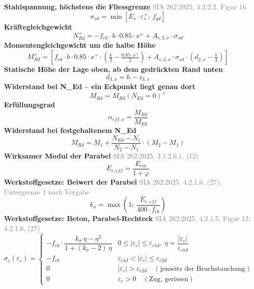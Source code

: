\documentclass[11pt,a4paper]{article}
\newcommand{\normref}[1]{{\small\textcolor{gray}{#1}}}
\begin{document}
\noindent\textbf{Stahlspannung, höchstens die Fliessgrenze} \hfill \normref{SIA 262:2025, 4.2.2.2, Figur 16}
\begin{equation*}
\sigma_{sd} = \min\left[E_s \cdot \varepsilon_s^{+};\ f_{yd}\right]
\end{equation*}
\noindent\textbf{Kräftegleichgewicht}
\begin{equation*}
N_{Rd}^{+} = -f_{cd} \cdot b \cdot 0.85 \cdot x^{+} + A_{s,2,x} \cdot \sigma_{sd}
\end{equation*}
\noindent\textbf{Momentengleichgewicht um die halbe Höhe}
\begin{equation*}
M_{Rd}^{+} = \left[f_{cd} \cdot b \cdot 0.85 \cdot x^{+} \cdot \left(\tfrac{h}{2} - \tfrac{0.85 \cdot x^{+}}{2}\right) + A_{s,2,x} \cdot \sigma_{sd} \cdot \left(d_{2,x} - \tfrac{h}{2}\right)\right]
\end{equation*}
\noindent\textbf{Statische Höhe der Lage oben, ab dem gedrückten Rand unten}
\begin{equation*}
d_{3,x} = h - z_{3,x}
\end{equation*}
\noindent\textbf{Widerstand bei N\_Ed – ein Eckpunkt liegt genau dort}
\begin{equation*}
M_{Rd} = M_{Rd}(N_{Ed}=0)^{+}
\end{equation*}
\noindent\textbf{Erfüllungsgrad}
\begin{equation*}
\alpha_{eff,x} = \frac{M_{Rd}}{M_{Ed}}
\end{equation*}
\noindent\textbf{Widerstand bei festgehaltenem N\_Ed}
\begin{equation*}
M_{Rd} = M_1 + \frac{N_{Ed} - N_1}{N_2 - N_1} \cdot \left(M_2 - M_1\right)
\end{equation*}
\noindent\textbf{Wirksamer Modul der Parabel} \hfill \normref{SIA 262:2025, 3.1.2.6.1, (12)}
\begin{equation*}
E_{c,eff} = \frac{E_{cm}}{1 + \varphi}
\end{equation*}
\noindent\textbf{Werkstoffgesetze: Beiwert der Parabel} \hfill \normref{SIA 262:2025, 4.2.1.6, (27); Untergrenze 1 nach Vorgabe}
\begin{equation*}
k_{\sigma} = \max\left(1;\ \frac{E_{c,eff}}{400 \cdot f_{ck}}\right)
\end{equation*}
\noindent\textbf{Werkstoffgesetze: Beton, Parabel-Rechteck} \hfill \normref{SIA 262:2025, 4.2.1.5, Figur 12; 4.2.1.6, (27)}
\begin{equation*}
\sigma_c(\varepsilon_c) = \begin{cases} -f_{ck} \cdot \dfrac{k_\sigma\,\eta - \eta^2}{1 + (k_\sigma - 2)\,\eta} & 0 \le |\varepsilon_c| \le \varepsilon_{c1d},\ \eta = \dfrac{|\varepsilon_c|}{\varepsilon_{c1d}} \\[2ex] -f_{ck} & \varepsilon_{c1d} < |\varepsilon_c| \le \varepsilon_{c2d} \\[1ex] 0 & |\varepsilon_c| > \varepsilon_{c2d} \quad (\text{jenseits der Bruchstauchung}) \\[1ex] 0 & \varepsilon_c > 0 \quad (\text{Zug, gerissen}) \end{cases}
\end{equation*}
\end{document}
